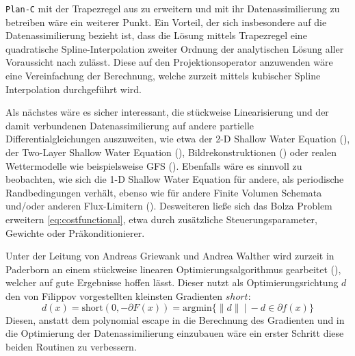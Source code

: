 \texttt{Plan-C} mit der Trapezregel aus \cite[S.23 (15)]{monster} zu erweitern und mit ihr Datenassimilierung zu betreiben wäre ein weiterer Punkt.
Ein Vorteil, der sich insbesondere auf die Datenassimilierung bezieht ist, dass die Lösung mittels Trapezregel eine quadratische Spline-Interpolation zweiter Ordnung der analytischen Lösung aller Voraussicht nach zulässt. Diese auf den Projektionsoperator anzuwenden wäre eine Vereinfachung der Berechnung, welche zurzeit mittels kubischer Spline Interpolation durchgeführt wird.

Als nächstes wäre es sicher interessant, die stückweise Linearisierung und der damit verbundenen Datenassimilierung auf andere partielle Differentialgleichungen auszuweiten, wie etwa der 2-D Shallow Water Equation (\cite[\S 3]{kurganov2007second}), der Two-Layer Shallow Water Equation (\cite{kurganov2009central}), Bildrekonstruktionen (\cite{korotaev2008retrieving}) oder realen Wettermodelle wie beispielsweise GFS (\cite{gfs}). 
Ebenfalls wäre es sinnvoll zu beobachten, wie sich die 1-D Shallow Water Equation für andere, als periodische Randbedingungen verhält, ebenso wie für andere Finite Volumen Schemata und/oder anderen Flux-Limitern (\cite{juntasaro2004comparative}).
Desweiteren ließe sich das Bolza Problem erweitern \eqref{eq:costfunctional}, etwa durch zusätzliche Steuerungsparameter, Gewichte oder Präkonditionierer.  

Unter der Leitung von Andreas Griewank und Andrea Walther wird zurzeit in Paderborn an einem stückweise linearen Optimierungsalgorithmus gearbeitet (\cite{griewank2014lipschitz}), welcher auf gute Ergebnisse hoffen lässt. 
Dieser nutzt als Optimierungsrichtung $d$ den von Filippov vorgestellten kleinsten Gradienten $short$:
\[
d(x) = \text{short}(0,-\partial F(x)) = \text{argmin} \lbrace \|d\| ~|~ -d \in \partial f(x) \rbrace
\]
Diesen, anstatt dem polynomial escape in die Berechnung des Gradienten und in die Optimierung der Datenassimilierung einzubauen wäre ein erster Schritt diese beiden Routinen zu verbessern.

